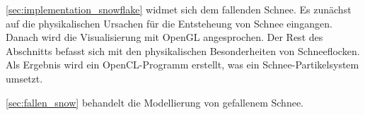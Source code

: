\autoref{sec:implementation_snowflake} widmet sich dem fallenden
Schnee. Es zunächst auf die physikalischen Ursachen für die
Entsteheung von Schnee eingangen. Danach wird die Visualisierung mit
OpenGL angesprochen. Der Rest des Abschnitts befasst sich mit den
physikalischen Besonderheiten von Schneeflocken. Als Ergebnis wird ein
OpenCL-Programm erstellt, was ein Schnee-Partikelsystem umsetzt.

\autoref{sec:fallen_snow} behandelt die Modellierung von gefallenem Schnee.
